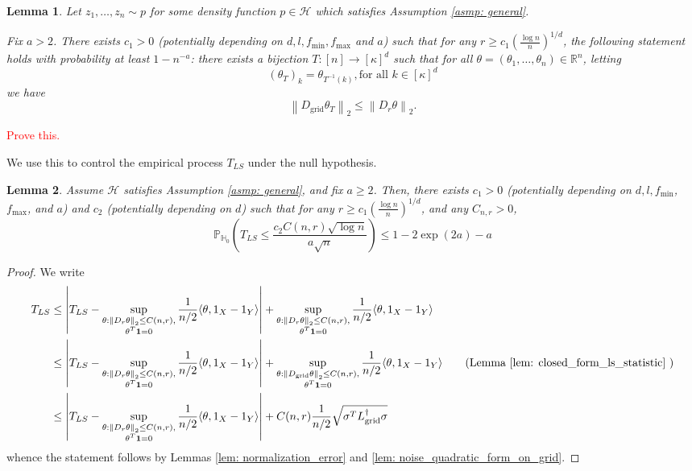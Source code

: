 \documentclass{article}
\newcommand{\Reals}{\mathbb{R}}
\newcommand{\norm}[1]{\left\lVert#1\right\rVert}
\newcommand{\abs}[1]{\left \lvert #1 \right \rvert}
\newcommand{\dotp}[2]{\langle #1, #2 \rangle}
\newcommand{\1}{\mathbb{I}}
\newcommand{\Pbb}{\mathbb{P}}
\newcommand{\grid}{\mathrm{grid}}
\theoremstyle{alden}
\theoremstyle{aldenthm}
\newtheorem{lemma}{Lemma}
\theoremstyle{definition}
\theoremstyle{remark}
\begin{document}
\begin{lemma}
	Let $z_1, \ldots,z_n \sim p$ for some density function $p \in \mathcal{H}$ which satisfies Assumption \ref{asmp: general}.
	
	Fix $a > 2$. There exists $c_1 > 0$ (potentially depending on $d, l, f_{\min}, f_{\max}$ and $a$) such that for any $r \geq c_1 \left(\frac{\log n}{n}\right)^{1/d}$, the following statement holds with probability at least $1 - n^{-a}$: there exists a bijection $T: [n] \to [\kappa]^d$ such that for all $\theta = (\theta_1, \ldots, \theta_n) \in \Reals^n$, letting
	\begin{equation*}
	(\theta_{T})_{k} = \theta_{T^{-1}(k)}, \textrm{for all $k \in [\kappa]^d$}
	\end{equation*}
	we have
	\begin{equation*}
	\norm{D_{\grid}\theta_{T}}_2 \leq \norm{D_r \theta}_2.
	\end{equation*}
\end{lemma}
\textcolor{red}{Prove this.}

We use this to control the empirical process $T_{LS}$ under the null hypothesis.
\begin{lemma}
	Assume $\mathcal{H}$ satisfies Assumption \ref{asmp: general}, and fix $a \geq 2$. Then, there exists $c_1 > 0$ (potentially depending on $d, l, f_{\min}$, $f_{\max}$, and $a$) and $c_2$ (potentially depending on $d$) such that for any $r \geq c_1 \left(\frac{\log n}{n}\right)^{1/d}$, and any $C_{n,r} > 0$,
	\begin{equation*}
	\Pbb_{\mathbb{H}_0}\left(T_{LS} \leq \frac{c_2 C(n,r)\sqrt{\log n} }{a \sqrt{n}} \right) \leq 1 - 2\exp(2a) - a
	\end{equation*}
\end{lemma}
\begin{proof}
	We write
	\begin{align*}
	T_{LS} & \leq \abs{T_{LS} - \sup_{\substack{\theta: \norm{D_r \theta}_2 \leq C(n,r), \\ \theta^T \mathbf{1} = 0} } \frac{1}{n/2}\dotp{\theta}{1_X - 1_Y}} + \sup_{\substack{\theta: \norm{D_r \theta}_2 \leq C(n,r), \\ \theta^T \mathbf{1} = 0} } \frac{1}{n/2}\dotp{\theta}{1_X - 1_Y} \\
	& \leq \abs{T_{LS} - \sup_{\substack{\theta: \norm{D_r \theta}_2 \leq C(n,r), \\ \theta^T \mathbf{1} = 0} } \frac{1}{n/2}\dotp{\theta}{1_X - 1_Y}} + \sup_{\substack{\theta: \norm{D_{\grid} \theta}_2 \leq C(n,r), \\ \theta^T \mathbf{1} = 0} } \frac{1}{n/2}\dotp{\theta}{1_X - 1_Y} \tag{Lemma \ref{lem: closed_form_ls_statistic} } \\
	& \leq \abs{T_{LS} - \sup_{\substack{\theta: \norm{D_r \theta}_2 \leq C(n,r), \\ \theta^T \mathbf{1} = 0} } \frac{1}{n/2}\dotp{\theta}{1_X - 1_Y}} + C(n,r) \frac{1}{n/2} \sqrt{\sigma^T L_{\grid}^{\dagger} \sigma}
	\end{align*}
	whence the statement follows by Lemmas \ref{lem: normalization_error} and \ref{lem: noise_quadratic_form_on_grid}.
\end{proof}
\end{document}
